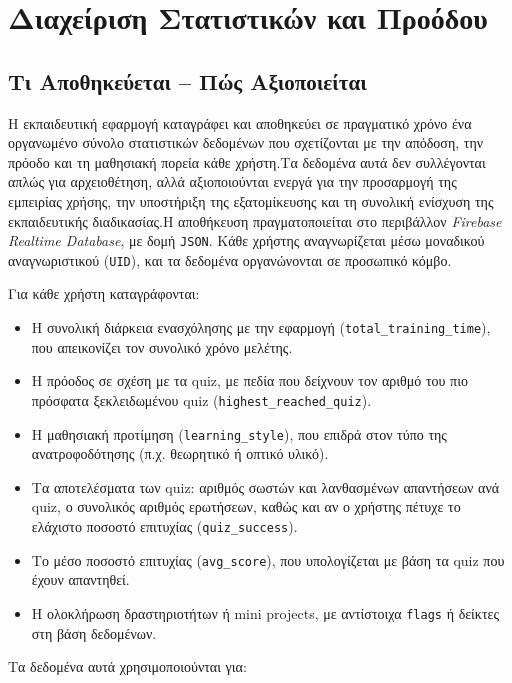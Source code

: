 \documentclass[11pt]{report}
\begin{document}
\chapter{Διαχείριση Στατιστικών και Προόδου}
\section{Τι Αποθηκεύεται – Πώς Αξιοποιείται}

Η εκπαιδευτική εφαρμογή καταγράφει και αποθηκεύει σε πραγματικό χρόνο ένα οργανωμένο σύνολο στατιστικών δεδομένων που σχετίζονται με την απόδοση, την πρόοδο και τη μαθησιακή πορεία κάθε χρήστη.Τα δεδομένα αυτά δεν συλλέγονται απλώς για αρχειοθέτηση, αλλά αξιοποιούνται ενεργά για την προσαρμογή της εμπειρίας χρήσης, την υποστήριξη της εξατομίκευσης και τη συνολική ενίσχυση της εκπαιδευτικής διαδικασίας.Η αποθήκευση πραγματοποιείται στο περιβάλλον \textit{Firebase Realtime Database}, με δομή \texttt{JSON}. Κάθε χρήστης αναγνωρίζεται μέσω μοναδικού αναγνωριστικού (\texttt{UID}), και τα δεδομένα οργανώνονται σε προσωπικό κόμβο.

\vspace{1em}
Για κάθε χρήστη καταγράφονται:

\begin{itemize}
    \item Η συνολική διάρκεια ενασχόλησης με την εφαρμογή (\texttt{total\_training\_time}), που απεικονίζει τον συνολικό χρόνο μελέτης.
    \item Η πρόοδος σε σχέση με τα quiz, με πεδία που δείχνουν τον αριθμό του πιο πρόσφατα ξεκλειδωμένου quiz (\texttt{highest\_reached\_quiz}).
    \item Η μαθησιακή προτίμηση (\texttt{learning\_style}), που επιδρά στον τύπο της ανατροφοδότησης (π.χ. θεωρητικό ή οπτικό υλικό).
    \item Τα αποτελέσματα των quiz: αριθμός σωστών και λανθασμένων απαντήσεων ανά quiz, ο συνολικός αριθμός ερωτήσεων, καθώς και αν ο χρήστης πέτυχε το ελάχιστο ποσοστό επιτυχίας (\texttt{quiz\_success}).
    \item Το μέσο ποσοστό επιτυχίας (\texttt{avg\_score}), που υπολογίζεται με βάση τα quiz που έχουν απαντηθεί.
    \item Η ολοκλήρωση δραστηριοτήτων ή mini projects, με αντίστοιχα \texttt{flags} ή δείκτες στη βάση δεδομένων.
\end{itemize}

\vspace{1em}
Τα δεδομένα αυτά χρησιμοποιούνται για:
\end{document}
